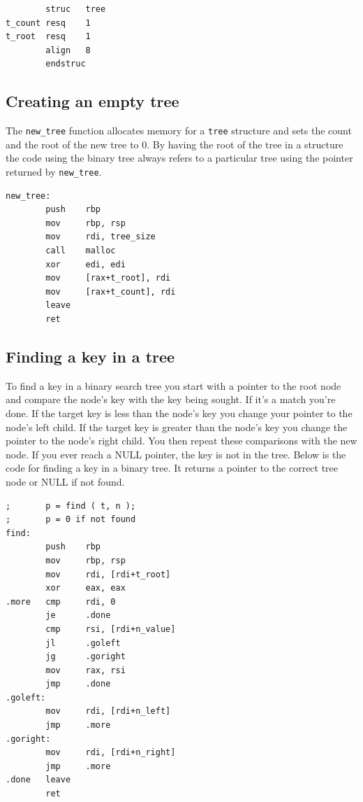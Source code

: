 \documentclass[11pt,b5paper]{book}
\begin{document}
\begin{verbatim}
        struc   tree
t_count resq    1
t_root  resq    1
        align   8
        endstruc
\end{verbatim}

\subsection{Creating an empty tree}

The {\tt new\_tree} function allocates memory for a {\tt tree} structure and sets the count and the root
of the new tree to 0.
By having the root of the tree in a structure the code using the binary tree always refers to a particular
tree using the pointer returned by {\tt new\_tree}.

\begin{verbatim}
new_tree:
        push    rbp
        mov     rbp, rsp
        mov     rdi, tree_size
        call    malloc
        xor     edi, edi
        mov     [rax+t_root], rdi
        mov     [rax+t_count], rdi
        leave
        ret
\end{verbatim}

\subsection{Finding a key in a tree}

To find a key in a binary search tree you start with a pointer to the root node and compare the node's key with the key being sought.
If it's a match you're done.
If the target key is less than the node's key you change your pointer to the node's left child.
If the target key is greater than the node's key you change the pointer to the node's right child.
You then repeat these comparisons with the new node.
If you ever reach a NULL pointer, the key is not in the tree.
Below is the code for finding a key in a binary tree.
It returns a pointer to the correct tree node or NULL if not found.

\begin{verbatim}
;       p = find ( t, n );
;       p = 0 if not found
find:
        push    rbp
        mov     rbp, rsp
        mov     rdi, [rdi+t_root]
        xor     eax, eax
.more   cmp     rdi, 0
        je      .done
        cmp     rsi, [rdi+n_value]
        jl      .goleft
        jg      .goright
        mov     rax, rsi
        jmp     .done
.goleft:
        mov     rdi, [rdi+n_left]
        jmp     .more
.goright:
        mov     rdi, [rdi+n_right]
        jmp     .more
.done   leave
        ret
\end{verbatim}
\end{document}
